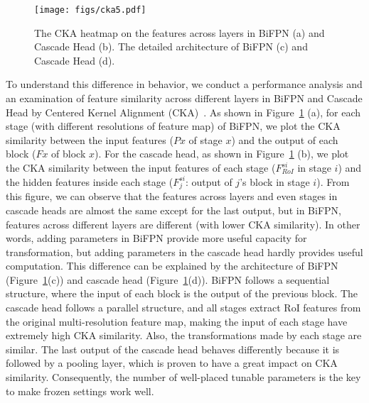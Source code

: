 \documentclass{article}
\begin{document}
\begin{figure}[h]
    \centering
    \texttt{[image: figs/cka5.pdf]}
    \caption{The CKA heatmap on the features across layers in BiFPN (a) and Cascade Head (b). The detailed architecture of BiFPN (c) and Cascade Head (d).}
    \label{fig:cka}
\end{figure}

To understand this difference in behavior, we conduct a performance analysis and an examination of feature similarity across different layers in BiFPN and Cascade Head by Centered Kernel Alignment (CKA)~\cite{cka}.
As shown in Figure~\ref{fig:cka} (a), for each stage (with different resolutions of feature map) of BiFPN, we plot the CKA similarity between the input features ($Px$ of stage $x$) and the output of each block ($Fx$ of block $x$).
For the cascade head, as shown in Figure~\ref{fig:cka} (b), we plot the CKA similarity between the input features of each stage ($F_{RoI}^{si}$ in stage $i$) and the hidden features inside each stage ($F_{j}^{si}$: output of $j$'s block in stage $i$).
From this figure, we can observe that the features across layers and even stages in cascade heads are almost the same except for the last output, but in BiFPN, features across different layers are different (with lower CKA similarity). In other words, adding parameters in BiFPN provide more useful capacity for transformation, but adding parameters in the cascade head hardly provides useful computation. 
This difference can be explained by the architecture of BiFPN (Figure~\ref{fig:cka}(c)) and cascade head (Figure~\ref{fig:cka}(d)). BiFPN follows a sequential structure, where the input of each block is the output of the previous block. The cascade head follows a parallel structure, and all stages extract RoI features from the original multi-resolution feature map, making the input of each stage have extremely high CKA similarity. Also, the transformations made by each stage are similar.
The last output of the cascade head behaves differently because it is followed by a pooling layer, which is proven to have a great impact on CKA similarity. Consequently, the number of well-placed tunable parameters is the key to make frozen settings work well.
\end{document}

